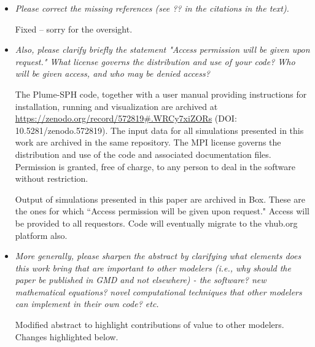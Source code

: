 \documentclass[11pt]{article}
\begin{document}
\begin{itemize}

\item {\it Please correct the missing references (see ?? in the citations in the text).}

Fixed -- sorry for the oversight.


\item {\it Also, please clarify briefly the statement "Access permission will be given upon request." What license governs the distribution and use of your code? Who will be given access, and who may be denied access? }

The Plume-SPH code, together with a user manual providing instructions for installation, running and visualization are archived at \url{ https://zenodo.org/record/572819#.WRCy7xiZORs} (DOI: 10.5281/zenodo.572819). The input data for all simulations presented in this work are archived in the same repository. The MPI license governs the distribution and use of the code and associated documentation files. Permission is granted, free of charge, to any person to deal in the software without restriction. 

Output of simulations presented in this paper are archived in Box. These are the ones for which ``Access permission will be given upon request."
Access will be provided to all requestors. Code will eventually migrate to the vhub.org platform also.

\item {\it More generally, please sharpen the abstract by clarifying what elements does this work bring that are important to other modelers (i.e., why should the paper be published in GMD and not elsewhere) - the software? new mathematical equations? novel computational techniques that other modelers can implement in their own code? etc.}

Modified abstract to highlight contributions of value to other modelers. Changes highlighted below.

\end{itemize}
\end{document}
